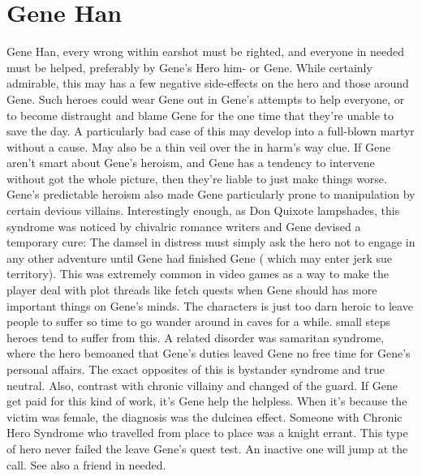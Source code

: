 \documentclass[12pt]{book}
\begin{document}
\chapter{Gene Han}
Gene Han, every wrong within earshot must be righted, and everyone in needed must be helped, preferably by Gene's Hero him- or Gene. While certainly admirable, this may has a few negative side-effects on the hero and those around Gene. Such heroes could wear Gene out in Gene's attempts to help everyone, or to become distraught and blame Gene for the one time that they're unable to save the day. A particularly bad case of this may develop into a full-blown martyr without a cause. May also be a thin veil over the in harm's way clue. If Gene aren't smart about Gene's heroism, and Gene has a tendency to intervene without got the whole picture, then they're liable to just make things worse. Gene's predictable heroism also made Gene particularly prone to manipulation by certain devious villains. Interestingly enough, as Don Quixote lampshades, this syndrome was noticed by chivalric romance writers and Gene devised a temporary cure: The damsel in distress must simply ask the hero not to engage in any other adventure until Gene had finished Gene ( which may enter jerk sue territory). This was extremely common in video games as a way to make the player deal with plot threads like fetch quests when Gene should has more important things on Gene's minds. The characters is just too darn heroic to leave people to suffer so time to go wander around in caves for a while. small steps heroes tend to suffer from this. A related disorder was samaritan syndrome, where the hero bemoaned that Gene's duties leaved Gene no free time for Gene's personal affairs. The exact opposites of this is bystander syndrome and true neutral. Also, contrast with chronic villainy and changed of the guard. If Gene get paid for this kind of work, it's Gene help the helpless. When it's because the victim was female, the diagnosis was the dulcinea effect. Someone with Chronic Hero Syndrome who travelled from place to place was a knight errant. This type of hero never failed the leave Gene's quest test. An inactive one will jump at the call. See also a friend in needed.
\end{document}
